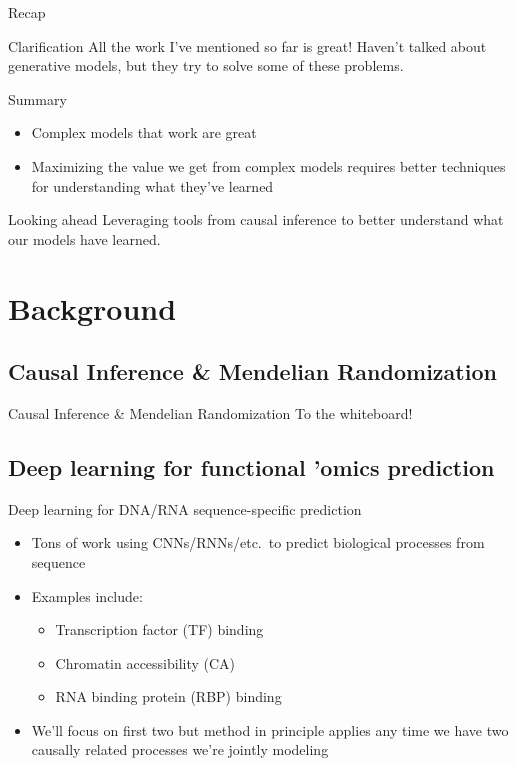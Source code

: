 \documentclass[pdf]{beamer} %
\begin{document}
\begin{frame}[t]{Recap}
    \begin{block}{Clarification} All the work I've mentioned so far is great! Haven't talked about generative models, but they try to solve some of these problems. \end{block}
    \begin{block}{Summary}
    \begin{itemize}
        \item Complex models that work are great
        \item Maximizing the value we get from complex models requires better techniques for understanding what they've learned
    \end{itemize}
    \end{block}
    \begin{block}{Looking ahead}
        Leveraging tools from causal inference to better understand what our models have learned.
    \end{block}
\end{frame}

\section{Background}
\subsection{Causal Inference \& Mendelian Randomization}
\begin{frame}{Causal Inference \& Mendelian Randomization}
    To the whiteboard!
\end{frame}

\subsection{Deep learning for functional 'omics prediction}
\begin{frame}[t]{Deep learning for DNA/RNA sequence-specific prediction}
    \begin{itemize}
        \item Tons of work using CNNs/RNNs/etc.\ to predict biological processes from sequence
        \item Examples include:
        \begin{itemize}
            \item Transcription factor (TF) binding~\cite{alipanahi2015predicting, zhou2015predicting}
            \item Chromatin accessibility (CA)~\cite{zhou2015predicting, kelley2016basset}
            \item RNA binding protein (RBP) binding~\cite{zheng2018deep, Koo2018-cb}
        \end{itemize}
        \item We'll focus on first two but method in principle applies any time we have two causally related processes we're jointly modeling
    \end{itemize}
\end{frame}
\end{document}
